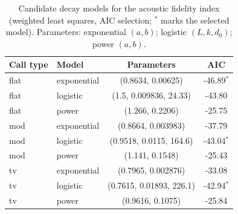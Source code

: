 \begin{table}[!ht]
\centering
\caption{Candidate decay models for the acoustic fidelity index (weighted least
squares, AIC selection; $^{*}$ marks the selected model). Parameters: exponential
$(a,b)$; logistic $(L,k,d_0)$; power $(a,b)$.}
\label{tab:decay}
\footnotesize
\begin{tabular}{llcc}
\toprule
Call type & Model & Parameters & AIC\\
\midrule
flat & exponential & (0.8634, 0.00625) & -46.89$^{*}$\\
flat & logistic & (1.5, 0.009836, 24.33) & -43.80\\
flat & power & (1.266, 0.2206) & -25.75\\
mod & exponential & (0.8664, 0.003983) & -37.79\\
mod & logistic & (0.9518, 0.0115, 164.6) & -43.04$^{*}$\\
mod & power & (1.141, 0.1548) & -25.43\\
tv & exponential & (0.7965, 0.002876) & -33.08\\
tv & logistic & (0.7615, 0.01893, 226.1) & -42.94$^{*}$\\
tv & power & (0.9616, 0.1075) & -25.84\\
\bottomrule
\end{tabular}
\end{table}
